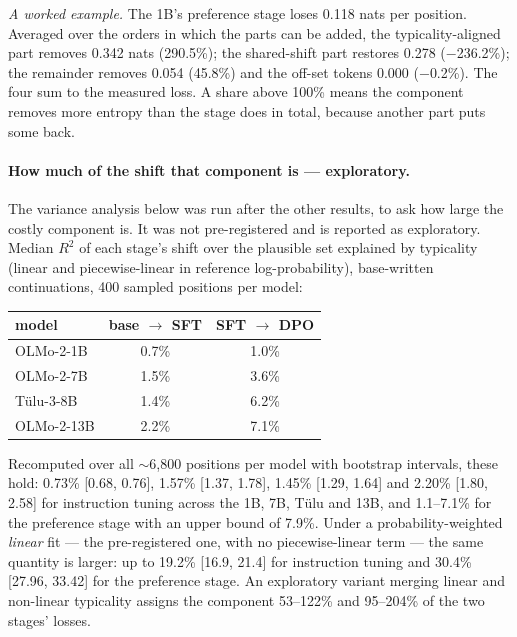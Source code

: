\documentclass[11pt]{article}
\begin{document}
\emph{A worked example.} The 1B's preference stage loses 0.118 nats per position.
Averaged over the orders in which the parts can be added, the typicality-aligned
part removes 0.342 nats (290.5\%); the shared-shift part restores 0.278
($-$236.2\%); the remainder removes 0.054 (45.8\%) and the off-set tokens 0.000
($-$0.2\%). The four sum to the measured loss. A share above 100\% means the
component removes more entropy than the stage does in total, because another part
puts some back.

\paragraph{How much of the shift that component is --- exploratory.} The variance
analysis below was run after the other results, to ask how large the costly
component is. It was not pre-registered and is reported as exploratory. Median
$R^2$ of each stage's shift over the plausible set explained by typicality (linear
and piecewise-linear in reference log-probability), base-written continuations,
400 sampled positions per model:

\begin{center}
\begin{tabular}{lcc}
\toprule
model & base $\to$ SFT & SFT $\to$ DPO \\
\midrule
OLMo-2-1B & 0.7\% & 1.0\% \\
OLMo-2-7B & 1.5\% & 3.6\% \\
T\"ulu-3-8B & 1.4\% & 6.2\% \\
OLMo-2-13B & 2.2\% & 7.1\% \\
\bottomrule
\end{tabular}
\end{center}

Recomputed over all $\sim$6{,}800 positions per model with bootstrap intervals,
these hold: 0.73\% [0.68, 0.76], 1.57\% [1.37, 1.78], 1.45\% [1.29, 1.64] and
2.20\% [1.80, 2.58] for instruction tuning across the 1B, 7B, T\"ulu and 13B, and
1.1--7.1\% for the preference stage with an upper bound of 7.9\%. Under a
probability-weighted \emph{linear} fit --- the pre-registered one, with no
piecewise-linear term --- the same quantity is larger: up to 19.2\% [16.9, 21.4]
for instruction tuning and 30.4\% [27.96, 33.42] for the preference stage. An
exploratory variant merging linear and non-linear typicality assigns the component
53--122\% and 95--204\% of the two stages' losses.
\end{document}
